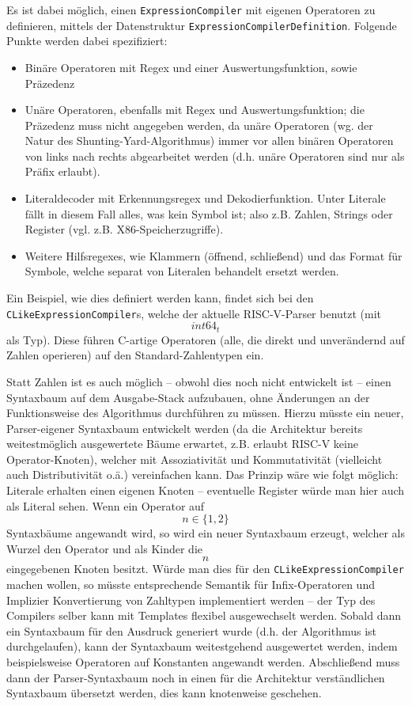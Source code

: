 Es ist dabei möglich, einen \texttt{ExpressionCompiler} mit eigenen Operatoren
zu definieren, mittels der Datenstruktur \texttt{ExpressionCompilerDefinition}.
Folgende Punkte werden dabei spezifiziert: \begin{itemize} \item Binäre
Operatoren mit Regex und einer Auswertungsfunktion, sowie Präzedenz \item Unäre
Operatoren, ebenfalls mit Regex und Auswertungsfunktion; die Präzedenz muss
nicht angegeben werden, da unäre Operatoren (wg. der Natur des
Shunting-Yard-Algorithmus) immer vor allen binären Operatoren von links nach
rechts abgearbeitet werden (d.h. unäre Operatoren sind nur als Präfix erlaubt).
\item Literaldecoder mit Erkennungsregex und Dekodierfunktion. Unter Literale
fällt in diesem Fall alles, was kein Symbol ist; also z.B. Zahlen, Strings oder
Register (vgl. z.B. X86-Speicherzugriffe). \item Weitere Hilfsregexes, wie
Klammern (öffnend, schließend) und das Format für Symbole, welche separat von
Literalen behandelt ersetzt werden. \end{itemize} Ein Beispiel, wie dies
definiert werden kann, findet sich bei den \texttt{CLikeExpressionCompiler}s,
welche der aktuelle RISC-V-Parser benutzt (mit $$int64_t$$ als Typ). Diese
führen C-artige Operatoren (alle, die direkt und unverändernd auf Zahlen
operieren) auf den Standard-Zahlentypen ein.

Statt Zahlen ist es auch möglich – obwohl dies noch nicht entwickelt ist – einen
Syntaxbaum auf dem Ausgabe-Stack aufzubauen, ohne Änderungen an der
Funktionsweise des Algorithmus durchführen zu müssen. Hierzu müsste ein neuer,
Parser-eigener Syntaxbaum entwickelt werden (da die Architektur bereits
weitestmöglich ausgewertete Bäume erwartet, z.B. erlaubt RISC-V keine
Operator-Knoten), welcher mit Assoziativität und Kommutativität (vielleicht auch
Distributivität o.ä.) vereinfachen kann. Das Prinzip wäre wie folgt möglich:
Literale erhalten einen eigenen Knoten – eventuelle Register würde man hier auch
als Literal sehen. Wenn ein Operator auf $$n\in\{1,2\}$$ Syntaxbäume angewandt
wird, so wird ein neuer Syntaxbaum erzeugt, welcher als Wurzel den Operator und
als Kinder die $$n$$ eingegebenen Knoten besitzt. Würde man dies für den
\texttt{CLikeExpressionCompiler} machen wollen, so müsste entsprechende Semantik
für Infix-Operatoren und Implizier Konvertierung von Zahltypen implementiert
werden – der Typ des Compilers selber kann mit Templates flexibel ausgewechselt
werden. Sobald dann ein Syntaxbaum für den Ausdruck generiert wurde (d.h. der
Algorithmus ist durchgelaufen), kann der Syntaxbaum weitestgehend ausgewertet
werden, indem beispielsweise Operatoren auf Konstanten angewandt werden.
Abschließend muss dann der Parser-Syntaxbaum noch in einen für die Architektur
verständlichen Syntaxbaum übersetzt werden, dies kann knotenweise geschehen.

